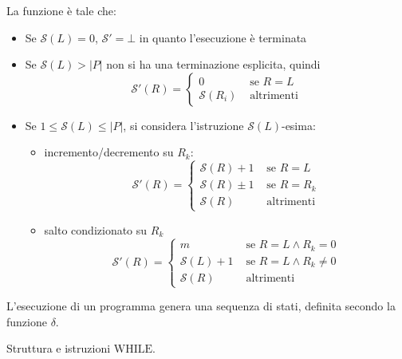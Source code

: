 \documentclass[12pt, answers]{exam}
\theoremstyle{plain}
\newcommand{\while}{\text{WHILE}}
\newcommand{\st}{\mathcal{S}}
\begin{document}
\begin{questions}
\begin{solution}
            La funzione è tale che: 
            \begin{itemize}
                \item Se $\st(L) = 0$, $\st' = \bot$ in quanto l'esecuzione è terminata
                
                \item Se $\st(L) > |P|$ non si ha una terminazione esplicita, quindi
                $$ \st' (R) = \begin{cases}
                    0 & \text{ se } R = L \\
                    \st(R_i) & \text{ altrimenti}
                \end{cases} $$
                
                \item Se $1 \leq \st (L) \leq |P|$, si considera l'istruzione $\st(L)$-esima:
                \begin{itemize}
                    \item incremento/decremento su $R_k$:
                    $$
                    \st' (R) = \begin{cases}
                        \st (R) + 1 & \text{ se } R = L \\ 
                        \st (R) \pm 1 & \text{ se } R = R_k \\
                        \st (R) & \text{ altrimenti}
                    \end{cases}
                    $$
                    
                    \item salto condizionato su $R_k$
                    $$
                    \st' (R) = \begin{cases}
                        m & \text{ se } R = L \wedge R_k = 0 \\
                        \st (L) + 1 & \text{ se } R = L \wedge R_k \neq 0 \\
                        \st (R) & \text{ altrimenti}
                    \end{cases}
                    $$
                \end{itemize}
            \end{itemize}
            
            L'esecuzione di un programma genera una sequenza di stati, definita secondo la funzione $\delta$.
        \end{solution}
        
        \question Struttura e istruzioni $\while$.
        

\end{questions}
\end{document}

